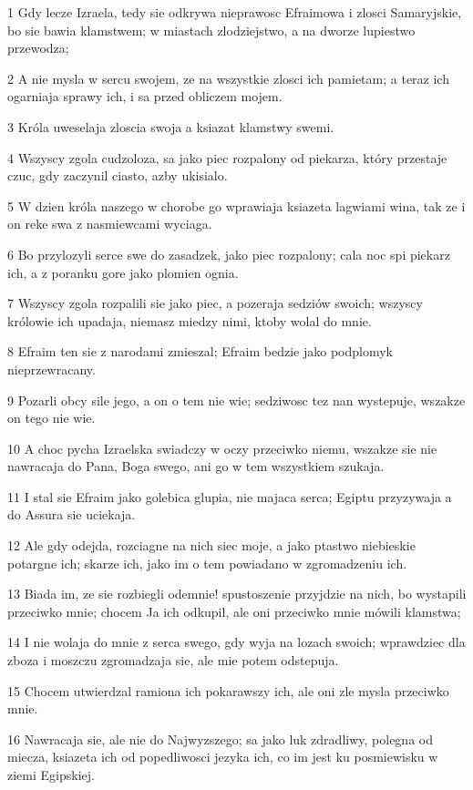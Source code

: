 \par 1 Gdy lecze Izraela, tedy sie odkrywa nieprawosc Efraimowa i zlosci Samaryjskie, bo sie bawia klamstwem; w miastach zlodziejstwo, a na dworze lupiestwo przewodza;
\par 2 A nie mysla w sercu swojem, ze na wszystkie zlosci ich pamietam; a teraz ich ogarniaja sprawy ich, i sa przed obliczem mojem.
\par 3 Króla uweselaja zloscia swoja a ksiazat klamstwy swemi.
\par 4 Wszyscy zgola cudzoloza, sa jako piec rozpalony od piekarza, który przestaje czuc, gdy zaczynil ciasto, azby ukisialo.
\par 5 W dzien króla naszego w chorobe go wprawiaja ksiazeta lagwiami wina, tak ze i on reke swa z nasmiewcami wyciaga.
\par 6 Bo przylozyli serce swe do zasadzek, jako piec rozpalony; cala noc spi piekarz ich, a z poranku gore jako plomien ognia.
\par 7 Wszyscy zgola rozpalili sie jako piec, a pozeraja sedziów swoich; wszyscy królowie ich upadaja, niemasz miedzy nimi, ktoby wolal do mnie.
\par 8 Efraim ten sie z narodami zmieszal; Efraim bedzie jako podplomyk nieprzewracany.
\par 9 Pozarli obcy sile jego, a on o tem nie wie; sedziwosc tez nan wystepuje, wszakze on tego nie wie.
\par 10 A choc pycha Izraelska swiadczy w oczy przeciwko niemu, wszakze sie nie nawracaja do Pana, Boga swego, ani go w tem wszystkiem szukaja.
\par 11 I stal sie Efraim jako golebica glupia, nie majaca serca; Egiptu przyzywaja a do Assura sie uciekaja.
\par 12 Ale gdy odejda, rozciagne na nich siec moje, a jako ptastwo niebieskie potargne ich; skarze ich, jako im o tem powiadano w zgromadzeniu ich.
\par 13 Biada im, ze sie rozbiegli odemnie! spustoszenie przyjdzie na nich, bo wystapili przeciwko mnie; chocem Ja ich odkupil, ale oni przeciwko mnie mówili klamstwa;
\par 14 I nie wolaja do mnie z serca swego, gdy wyja na lozach swoich; wprawdziec dla zboza i moszczu zgromadzaja sie, ale mie potem odstepuja.
\par 15 Chocem utwierdzal ramiona ich pokarawszy ich, ale oni zle mysla przeciwko mnie.
\par 16 Nawracaja sie, ale nie do Najwyzszego; sa jako luk zdradliwy, polegna od miecza, ksiazeta ich od popedliwosci jezyka ich, co im jest ku posmiewisku w ziemi Egipskiej.

